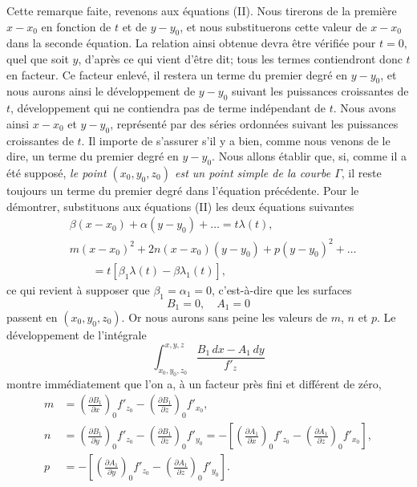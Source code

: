 \documentclass{article}
\begin{document}
Cette remarque faite, revenons aux équations (II). Nous tirerons de la première $x - x_{0}$ en fonction de $t$ et de $y - y_{0}$, et nous substituerons cette valeur de $x - x_{0}$ dans la seconde équation. La relation ainsi obtenue devra être vérifiée pour $t = 0$, quel que soit $y$, d'après ce qui vient d'être dit; tous les termes contiendront donc $t$ en facteur. Ce facteur enlevé, il restera un terme du premier degré en $y - y_{0}$, et nous aurons ainsi le développement de $y - y_{0}$ suivant les puissances croissantes de $t$, développement qui ne contiendra pas de terme indépendant de $t$. Nous avons ainsi $x - x_{0}$ et $y - y_{0}$, représenté par des séries ordonnées suivant les puissances croissantes de $t$. Il importe de s'assurer
s'il y a bien, comme nous venons de le dire, un terme du premier degré en $y - y_{0}$. Nous allons établir que, si, comme il a été supposé, \emph{le point $(x_{0}, y_{0}, z_{0})$ est un point simple de la courbe $\Gamma$}, il reste toujours un terme du premier degré dans l'équation précédente. Pour le démontrer, substituons aux équations (II) les deux équations suivantes
\[
\begin{aligned}
&\beta(x - x_{0}) + \alpha(y - y_{0}) + \ldots = t\lambda(t), \\
&m(x - x_{0})^{2} + 2n(x - x_{0})(y - y_{0}) + p(y - y_{0})^{2} + \ldots \\
&\qquad = t[\beta_{1}\lambda(t) - \beta\lambda_{1}(t)],
\end{aligned}
\]
ce qui revient à supposer que $\beta_{1} = \alpha_{1} = 0$, c'est-à-dire que les surfaces
\[
B_{1} = 0, \quad A_{1} = 0
\]
passent en $(x_{0}, y_{0}, z_{0})$. Or nous aurons sans peine les valeurs de $m$, $n$ et $p$. Le développement de l'intégrale
\[
\int_{x_{0}, y_{0}, z_{0}}^{x, y, z} \frac{B_{1}\,dx - A_{1}\,dy}{f'_{z}}
\]
montre immédiatement que l'on a, à un facteur près fini et différent de zéro,
\[
\begin{aligned}
m &= \left( \frac{\partial B_{1}}{\partial x} \right)_{0} f'_{z_{0}} - \left( \frac{\partial B_{1}}{\partial z} \right)_{0} f'_{x_{0}}, \\
n &= \left( \frac{\partial B_{1}}{\partial y} \right)_{0} f'_{z_{0}} - \left( \frac{\partial B_{1}}{\partial z} \right)_{0} f'_{y_{0}} = - \left[ \left( \frac{\partial A_{1}}{\partial x} \right)_{0} f'_{z_{0}} - \left( \frac{\partial A_{1}}{\partial z} \right)_{0} f'_{x_{0}} \right], \\
p &= - \left[ \left( \frac{\partial A_{1}}{\partial y} \right)_{0} f'_{z_{0}} - \left( \frac{\partial A_{1}}{\partial z} \right)_{0} f'_{y_{0}} \right].
\end{aligned}
\]
\end{document}
